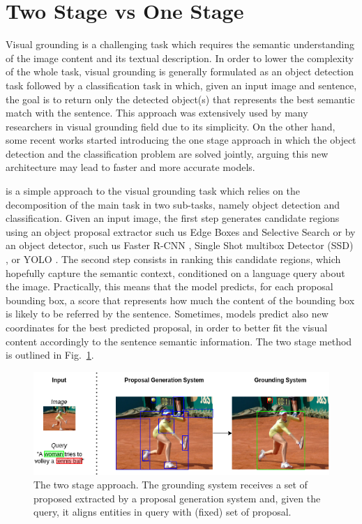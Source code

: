 \section{Two Stage vs One Stage}
\label{sec:two-stage-vs-one-stage}

Visual grounding is a challenging task which requires the semantic
understanding of the image content and its textual description. In
order to lower the complexity of the whole task, visual grounding is
generally formulated as an object detection task followed by a
classification task in which, given an input image and sentence, the
goal is to return only the detected object(s) that represents the best
semantic match with the sentence. This approach was extensively used
by many researchers in visual grounding field
\cite{rohrbach2016grounding, xiao2017weakly, akbari2019multi, chen2018knowledge, datta2019align2ground, wang2020maf}
due to its simplicity. On the other hand, some recent works started
introducing the one stage approach \cite{yang2019fast,sadhu2019zero}
in which the object detection and the classification problem are
solved jointly, arguing this new architecture may lead to faster and
more accurate models.

 is a simple approach to the visual
grounding task which relies on the decomposition of the main task in
two sub-tasks, namely object detection and classification. Given an
input image, the first step generates candidate regions using an
object proposal extractor such us Edge Boxes \cite{zitnick2014edge}
and Selective Search \cite{uijlings2013selective} or by an object
detector, such us Faster R-CNN \cite{girshick2014rich}, Single Shot
multibox Detector (SSD) \cite{liu2016ssd}, or YOLO
\cite{redmon2016you}. The second step consists in ranking this
candidate regions, which hopefully capture the semantic context,
conditioned on a language query about the image. Practically, this
means that the model predicts, for each proposal bounding box, a score
that represents how much the content of the bounding box is likely to
be referred by the sentence. Sometimes, models predict also new
coordinates for the best predicted proposal, in order to better fit
the visual content accordingly to the sentence semantic information.
The two stage method is outlined in Fig.~\ref{fig:two-stage-approach}.

\begin{figure}
  \centering
  \includegraphics[width=.8\textwidth]{figures/two-stage-approach.png}
  \caption[Two stage approach]{
    The two stage approach. The grounding system receives a set of
    proposed extracted by a proposal generation system and, given the
    query, it aligns entities in query with (fixed) set of proposal.
  }
  \label{fig:two-stage-approach}
\end{figure}

